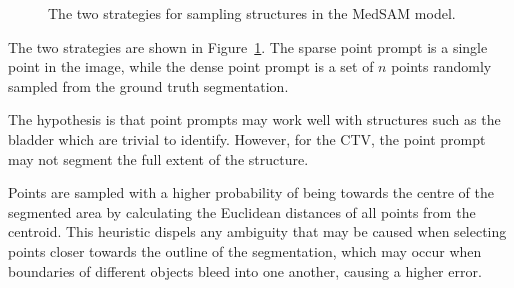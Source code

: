 \documentclass[12pt,twoside]{report}
\begin{document}
\begin{figure}
  \centering
  \caption{The two strategies for sampling structures in the MedSAM model.}\label{fig:point-prompt}
\end{figure}

The two strategies are shown in Figure~\ref{fig:point-prompt}. The sparse point prompt is a single point in the image, while the dense point prompt is a set of $n$ points randomly sampled from the ground truth segmentation.

The hypothesis is that point prompts may work well with structures such as the bladder which are trivial to identify. However, for the CTV, the point prompt may not segment the full extent of the structure.

Points are sampled with a higher probability of being towards the centre of the segmented area by calculating the Euclidean distances of all points from the centroid. This heuristic dispels any ambiguity that may be caused when selecting points closer towards the outline of the segmentation, which may occur when boundaries of different objects bleed into one another, causing a higher error.
\end{document}
